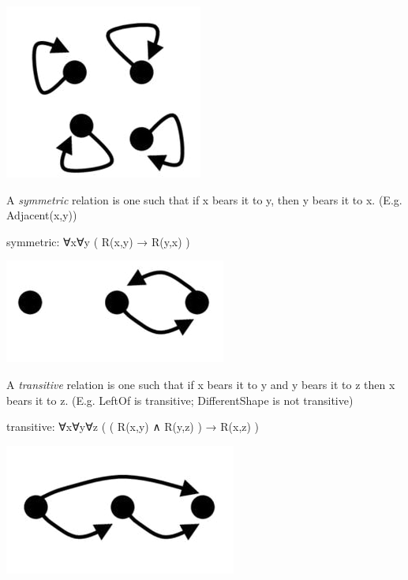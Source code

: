 \documentclass[12pt]{extarticle}
\begin{document}
\begin{multicols*}{3}
\begin{minipage}{\columnwidth}
\begin{center}
\includegraphics[scale=0.3]{img/reflexive.png}
\end{center}
\end{minipage}
 
\begin{minipage}{\columnwidth}
 
A \emph{symmetric} relation is one such that if x bears it to y, then y bears it to x. (E.g. Adjacent(x,y))
 
symmetric: ∀x∀y ( R(x,y) → R(y,x) )
 
\begin{center}
\includegraphics[scale=0.3]{img/symmetric.png}
\end{center}
\end{minipage}
 
\begin{minipage}{\columnwidth}
 
A \emph{transitive} relation is one such that if x bears it to y and y bears it to z then x bears it to z. (E.g. LeftOf is transitive; DifferentShape is not transitive)
 
transitive: ∀x∀y∀z ( ( R(x,y) ∧ R(y,z) ) → R(x,z) )
 
\begin{center}
\includegraphics[scale=0.3]{img/transitive.png}
\end{center}
\end{minipage}
 

\end{multicols*}
\end{document}
